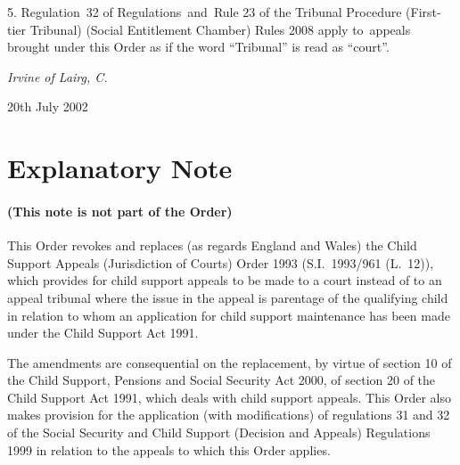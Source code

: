 \documentclass[12pt,a4paper]{article}
\begin{document}
5.  Regulation~32 of Regulations~and~Rule 23 of the Tribunal Procedure (First-tier Tribunal) (Social Entitlement Chamber) Rules 2008 apply to~appeals brought under this Order as if the word “Tribunal” is read as “court”.


\bigskip


{\raggedleft
\emph{Irvine of Lairg, C.}%

}

20th July 2002

\small

\part{Explanatory Note}

\renewcommand\parthead{— Explanatory Note}

\subsection*{(This note is not part of the Order)}

This Order revokes and replaces (as regards England and Wales) the Child Support Appeals (Jurisdiction of Courts) Order 1993 (S.I.\ 1993/961 (L.\ 12)), which provides for child support appeals to be made to a court instead of to an appeal tribunal where the issue in the appeal is parentage of the qualifying child in relation to whom an application for child support maintenance has been made under the Child Support Act 1991.

The amendments are consequential on the replacement, by virtue of section 10 of the Child Support, Pensions and Social Security Act 2000, of section 20 of the Child Support Act 1991, which deals with child support appeals. This Order also makes provision for the application (with modifications) of regulations 31 and 32 of the Social Security and Child Support (Decision and Appeals) Regulations 1999 in relation to the appeals to which this Order applies. 
\end{document}
